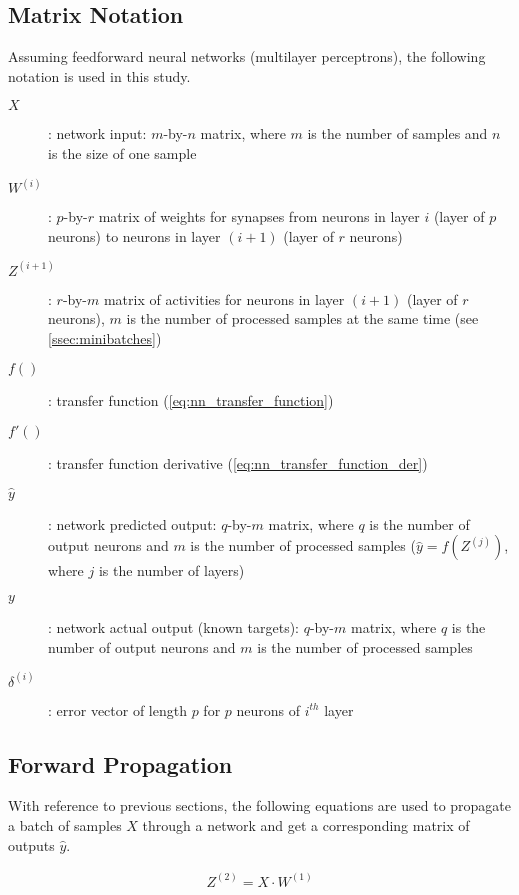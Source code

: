 \subsection{Matrix Notation} \label{ssec:matrix_notation}
Assuming feedforward neural networks (multilayer perceptrons), the following notation is used in this study.

\begin{description}
\item[$ X $] : network input: $ m $-by-$ n $ matrix, where $ m $ is the number of samples and $ n $ is the size of one sample
\item[$ W^{(i)} $] : $ p $-by-$ r $ matrix of weights for synapses from neurons in layer $ i $ (layer of $ p $ neurons) to neurons in layer $ (i+1) $ (layer of $ r $ neurons)
\item[$ Z^{(i+1)} $] : $ r $-by-$ m $ matrix of activities for neurons in layer $ (i+1) $ (layer of $ r $ neurons), $ m $ is the number of processed samples at the same time (see \cref{ssec:minibatches})
\item[$ f() $] : transfer function (\cref{eq:nn_transfer_function})
\item[$ f'() $] : transfer function derivative (\cref{eq:nn_transfer_function_der})
\item[$ \hat{y} $] : network predicted output: $ q $-by-$ m $ matrix, where $ q $ is the number of output neurons and $ m $ is the number of processed samples ($ \hat{y} = f(Z^{(j)}) $, where $ j $ is the number of layers)
\item[$ y $] : network actual output (known targets): $ q $-by-$ m $ matrix, where $ q $ is the number of output neurons and $ m $ is the number of processed samples
\item[$ \delta^{(i)} $] : error vector of length $ p $ for $ p $ neurons of $ i^{th} $ layer
\end{description}

\subsection{Forward Propagation} \label{ssec:forward_propagation}
With reference to previous sections, the following equations are used to propagate a batch of samples $ X $ through a network and get a corresponding matrix of outputs $ \hat{y} $.

\begin{align}
Z^{(2)} = X \cdot W^{(1)}
\end{align}

